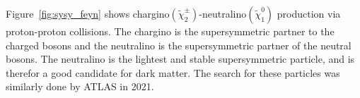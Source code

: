Figure \ref{fig:sysy_feyn} shows chargino$(\tilde{\chi}_2^{\pm})$-neutralino$(\tilde{\chi}_1^{0})$ production via proton-proton collisions. 
The chargino is the supersymmetric partner 
to the charged bosons and the neutralino is the supersymmetric partner of the neutral bosons. The neutralino
is the lightest and stable supersymmetric particle, and is therefor a good candidate for dark matter. 
The search for these particles was similarly done by ATLAS in 2021\cite{atlas_search_2021}. 